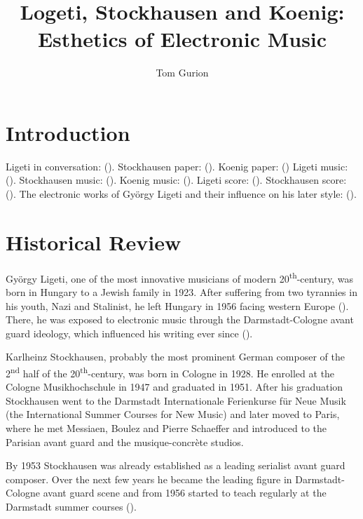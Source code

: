 \documentclass[a4paper,11pt]{article}
\title{Logeti, Stockhausen and Koenig:\\Esthetics of Electronic Music}
\author{Tom Gurion}
\begin{document}
\maketitle
\tableofcontents

\section{Introduction}
\label{sec:introduction}

Ligeti in conversation: (\cite{varnai}).
Stockhausen paper: (\cite{stockhausen}).
Koenig paper: (\cite{koenig})
Ligeti music: (\cite{rami_music}).
Stockhausen music: (\cite{gesang_music}).
Koenig music: (\cite{todo_music}).
Ligeti score: (\cite{rami}).
Stockhausen score: (\cite{gesang}).
The electronic works of Gy{\"o}rgy Ligeti and their influence on his later style: (\cite{levy2006}).

\section{Historical Review}
\label{sec:historical_Review}

Gy{\"o}rgy Ligeti, one of the most innovative musicians of modern 20\textsuperscript{th}-century, was born in Hungary to a Jewish family in 1923.
After suffering from two tyrannies in his youth, Nazi and Stalinist, he left Hungary in 1956 facing western Europe (\cite{ligeti_grove}).
There, he was exposed to electronic music through the Darmstadt-Cologne avant guard ideology, which influenced his writing ever since (\cite[p. TODO]{levy2006}).

Karlheinz Stockhausen, probably the most prominent German composer of the 2\textsuperscript{nd} half of the 20\textsuperscript{th}-century, was born in Cologne in 1928.
He enrolled at the Cologne Musikhochschule in 1947 and graduated in 1951.
After his graduation Stockhausen went to the Darmstadt Internationale Ferienkurse f{\"u}r Neue Musik (the International Summer Courses for New Music) and later moved to Paris, where he met Messiaen, Boulez and Pierre Schaeffer and introduced to the Parisian avant guard and the musique-concr{\`e}te studios.

By 1953 Stockhausen was already established as a leading serialist avant guard composer.
Over the next few years he became the leading figure in Darmstadt-Cologne avant guard scene and from 1956 started to teach regularly at the Darmstadt summer courses (\cite{stockhausen_grove}).
\end{document}
